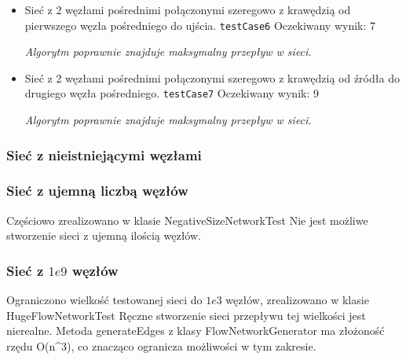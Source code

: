 \begin{itemize}[nosep]
    \item Sieć z 2 węzłami pośrednimi połączonymi szeregowo z krawędzią od
    pierwszego węzła pośredniego do ujścia.
    \texttt{testCase6}
    Oczekiwany wynik: 7

    \emph{Algorytm poprawnie znajduje maksymalny przepływ w sieci.}

    \item Sieć z 2 węzłami pośrednimi połączonymi szeregowo z krawędzią od
    źródła do drugiego węzła pośredniego.
    \texttt{testCase7}
    Oczekiwany wynik: 9

    \emph{Algorytm poprawnie znajduje maksymalny przepływ w sieci.}

\end{itemize}


\subsubsection{Sieć z nieistniejącymi węzłami}


\subsubsection{Sieć z ujemną liczbą węzłów}
Częściowo zrealizowano w klasie NegativeSizeNetworkTest Nie jest możliwe
stworzenie sieci z ujemną ilością węzłów.

\subsubsection{Sieć z $1e9$ węzłów}
Ograniczono wielkość testowanej sieci do $1e3$ węzłów, zrealizowano w klasie
HugeFlowNetworkTest Ręczne stworzenie sieci przepływu tej wielkości jest
nierealne. Metoda generateEdges z klasy FlowNetworkGenerator ma złożoność
rzędu O(n^3), co znacząco ogranicza możliwości w tym zakresie.

